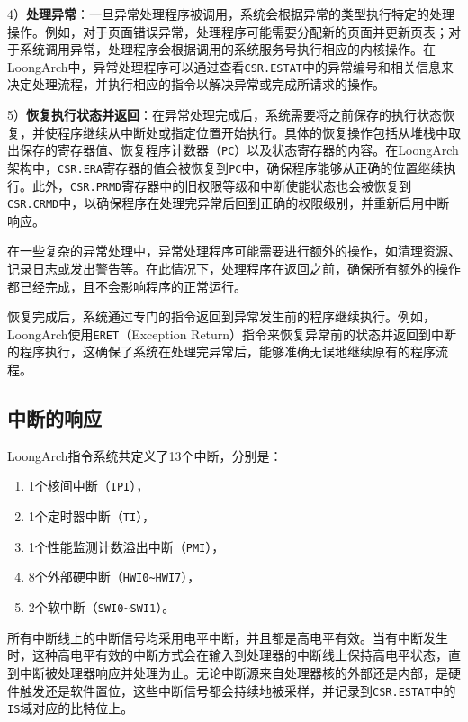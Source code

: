 4）\textbf{处理异常}：一旦异常处理程序被调用，系统会根据异常的类型执行特定的处理操作。例如，对于页面错误异常，处理程序可能需要分配新的页面并更新页表；对于系统调用异常，处理程序会根据调用的系统服务号执行相应的内核操作。在LoongArch中，异常处理程序可以通过查看\texttt{CSR.ESTAT}中的异常编号和相关信息来决定处理流程，并执行相应的指令以解决异常或完成所请求的操作。

5）\textbf{恢复执行状态并返回}：在异常处理完成后，系统需要将之前保存的执行状态恢复，并使程序继续从中断处或指定位置开始执行。具体的恢复操作包括从堆栈中取出保存的寄存器值、恢复程序计数器（\texttt{PC}）以及状态寄存器的内容。在LoongArch架构中，\texttt{CSR.ERA}寄存器的值会被恢复到\texttt{PC}中，确保程序能够从正确的位置继续执行。此外，\texttt{CSR.PRMD}寄存器中的旧权限等级和中断使能状态也会被恢复到\texttt{CSR.CRMD}中，以确保程序在处理完异常后回到正确的权限级别，并重新启用中断响应。

在一些复杂的异常处理中，异常处理程序可能需要进行额外的操作，如清理资源、记录日志或发出警告等。在此情况下，处理程序在返回之前，确保所有额外的操作都已经完成，且不会影响程序的正常运行。

恢复完成后，系统通过专门的指令返回到异常发生前的程序继续执行。例如，LoongArch使用\texttt{ERET}（Exception Return）指令来恢复异常前的状态并返回到中断的程序执行，这确保了系统在处理完异常后，能够准确无误地继续原有的程序流程。

\subsection{中断的响应}\label{sec:07-exceptions-010}

LoongArch指令系统共定义了13个中断，分别是：

\begin{enumerate}
\item 1个核间中断（\texttt{IPI}），
\item 1个定时器中断（\texttt{TI}），
\item 1个性能监测计数溢出中断（\texttt{PMI}），
\item 8个外部硬中断（\texttt{HWI0\textasciitilde{}HWI7}），
\item 2个软中断（\texttt{SWI0\textasciitilde{}SWI1}）。
\end{enumerate}


所有中断线上的中断信号均采用电平中断，并且都是高电平有效。当有中断发生时，这种高电平有效的中断方式会在输入到处理器的中断线上保持高电平状态，直到中断被处理器响应并处理为止。无论中断源来自处理器核的外部还是内部，是硬件触发还是软件置位，这些中断信号都会持续地被采样，并记录到\texttt{CSR.ESTAT}中的\texttt{IS}域对应的比特位上。


